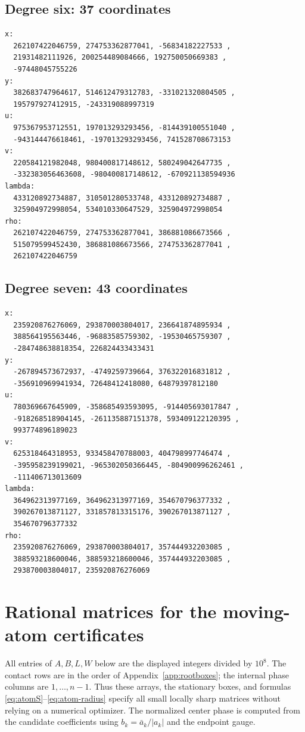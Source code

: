 \documentclass[11pt]{article}
\begin{document}
\subsection*{Degree six: 37 coordinates}
\begin{verbatim}
x:
  262107422046759, 274753362877041, -56834182227533 ,
  21931482111926, 200254489084666, 192750050669383 ,
  -97448045755226
y:
  382683747964617, 514612479312783, -331021320804505 ,
  195797927412915, -243319088997319
u:
  975367953712551, 197013293293456, -814439100551040 ,
  -943144476618461, -197013293293456, 741528708673153
v:
  220584121982048, 980400817148612, 580249042647735 ,
  -332383056463608, -980400817148612, -670921138594936
lambda:
  433120892734887, 310501280533748, 433120892734887 ,
  325904972998054, 534010330647529, 325904972998054
rho:
  262107422046759, 274753362877041, 386881086673566 ,
  515079599452430, 386881086673566, 274753362877041 ,
  262107422046759
\end{verbatim}
\subsection*{Degree seven: 43 coordinates}
\begin{verbatim}
x:
  235920876276069, 293870003804017, 236641874895934 ,
  388564195563446, -96883585759302, -19530465759307 ,
  -284748638818354, 226824433433431
y:
  -267894573672937, -4749259739664, 376322016831812 ,
  -356910969941934, 72648412418080, 64879397812180
u:
  780369667645909, -358685493593095, -914405693017847 ,
  -918268518904145, -261135887151378, 593409122120395 ,
  993774896189023
v:
  625318464318953, 933458470788003, 404798997746474 ,
  -395958239199021, -965302050366445, -804900996262461 ,
  -111406713013609
lambda:
  364962313977169, 364962313977169, 354670796377332 ,
  390267013871127, 331857813315176, 390267013871127 ,
  354670796377332
rho:
  235920876276069, 293870003804017, 357444932203085 ,
  388593218600046, 388593218600046, 357444932203085 ,
  293870003804017, 235920876276069
\end{verbatim}


\section{Rational matrices for the moving-atom certificates}\label{app:matrices}
All entries of $A,B,L,W$ below are the displayed integers divided by $10^8$.
The contact rows are in the order of Appendix~\ref{app:rootboxes}; the
internal phase columns are $1,\ldots,n-1$. Thus these arrays, the stationary
boxes, and formulas \eqref{eq:atomS}--\eqref{eq:atom-radius} specify all
small locally sharp matrices without relying on a numerical optimizer.
The normalized center phase is computed from the candidate coefficients
using $b_k=\bar a_k/|a_k|$ and the endpoint gauge.
\begingroup\scriptsize
\end{document}
